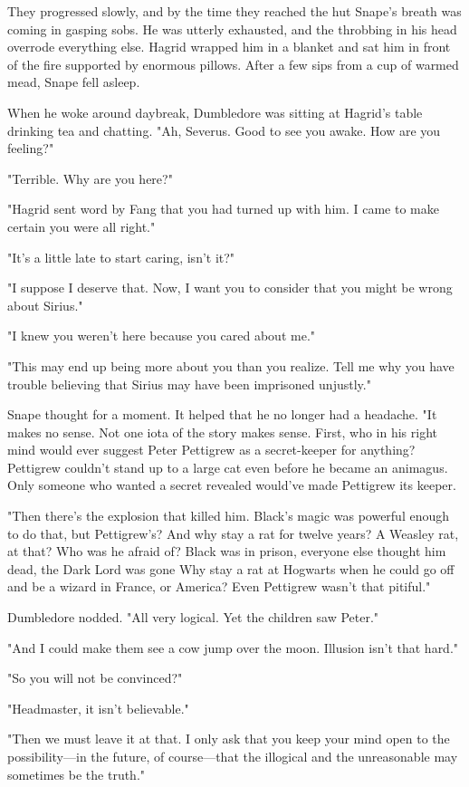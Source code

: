 They progressed slowly, and by the time they reached the hut Snape's breath was coming in gasping sobs. He was utterly exhausted, and the throbbing in his head overrode everything else. Hagrid wrapped him in a blanket and sat him in front of the fire supported by enormous pillows. After a few sips from a cup of warmed mead, Snape fell asleep.

When he woke around daybreak, Dumbledore was sitting at Hagrid's table drinking tea and chatting. "Ah, Severus. Good to see you awake. How are you feeling?"

"Terrible. Why are you here?"

"Hagrid sent word by Fang that you had turned up with him. I came to make certain you were all right."

"It's a little late to start caring, isn't it?"

"I suppose I deserve that. Now, I want you to consider that you might be wrong about Sirius."

"I knew you weren't here because you cared about me."

"This may end up being more about you than you realize. Tell me why you have trouble believing that Sirius may have been imprisoned unjustly."

Snape thought for a moment. It helped that he no longer had a headache. "It makes no sense. Not one iota of the story makes sense. First, who in his right mind would ever suggest Peter Pettigrew as a secret-keeper for anything? Pettigrew couldn't stand up to a large cat even before he became an animagus. Only someone who wanted a secret revealed would've made Pettigrew its keeper.

"Then there's the explosion that killed him. Black's magic was powerful enough to do that, but Pettigrew's? And why stay a rat for twelve years? A Weasley rat, at that? Who was he afraid of? Black was in prison, everyone else thought him dead, the Dark Lord was gone{\el} Why stay a rat at Hogwarts when he could go off and be a wizard in France, or America? Even Pettigrew wasn't that pitiful."

Dumbledore nodded. "All very logical. Yet the children saw Peter."

"And I could make them see a cow jump over the moon. Illusion isn't that hard."

"So you will not be convinced?"

"Headmaster, it isn't believable."

"Then we must leave it at that. I only ask that you keep your mind open to the possibility—in the future, of course—that the illogical and the unreasonable may sometimes be the truth."

